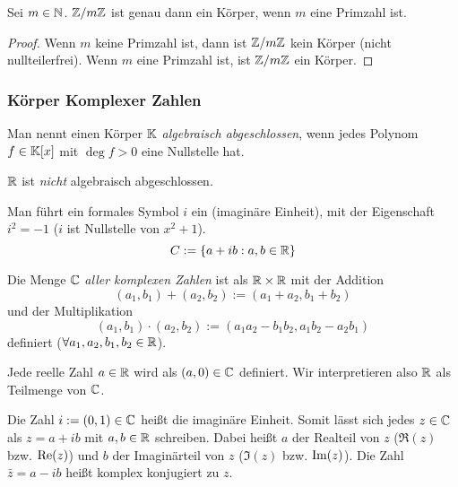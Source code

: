 \begin{thm}
	Sei $ m \in \mathbb N $. $ \mathbb Z/m\mathbb Z $ ist genau dann ein Körper, wenn $ m $ eine Primzahl ist.
\end{thm}
\begin{proof}
	Wenn $ m $ keine Primzahl ist, dann ist $ \mathbb Z/m\mathbb Z $ kein Körper (nicht nullteilerfrei). Wenn $ m $ eine Primzahl ist, ist $ \mathbb Z/m\mathbb Z $ ein Körper.
\end{proof}

\subsubsection{Körper Komplexer Zahlen}

Man nennt einen Körper $ \mathbb K $ \emph{algebraisch abgeschlossen}, wenn jedes Polynom $ f \in \mathbb K[x] $ mit $ \deg f > 0 $ eine Nullstelle hat.

\begin{bem}
	$ \mathbb R $ ist \emph{nicht} algebraisch abgeschlossen.
\end{bem}

\begin{bem}[Intuition zu $ \C $]
	Man führt ein formales Symbol $ i $ ein (imaginäre Einheit), mit der Eigenschaft $ i^2 = -1 $ ($ i $ ist Nullstelle von $ x^2+1 $).
	\begin{equation*}
		C := \{ a+ib : a,b \in \mathbb R \}
	\end{equation*}
\end{bem}

\begin{bem}
	Die Menge $ \C $ \emph{aller komplexen Zahlen} ist als $ \mathbb R \times \mathbb R $ mit der Addition 
	\begin{equation*}
		(a_{1},b_{1})+(a_{2},b_{2}) := (a_{1} + a_{2}, b_{1} + b_{2} )
	\end{equation*} 
	und der Multiplikation
	\begin{equation*}
		(a_{1},b_{1})\cdot (a_{2},b_{2}) := (a_{1} a_{2} - b_{1} b_{2}, a_{1} b_{2} - a_{2} b_{1})
	\end{equation*}
	definiert ($ \forall a_1, a_2, b_1, b_2 \in \mathbb R $).
	
	Jede reelle Zahl $ a \in \mathbb R $ wird als $ (a,0) \in \mathbb C $ definiert. Wir interpretieren also $ \mathbb R $ als Teilmenge von $ \C $.
	
	Die Zahl $ i := (0,1) \in \mathbb C $ heißt die imaginäre Einheit. Somit lässt sich jedes $ z \in \mathbb C $ als $ z = a+ib $ mit $ a,b \in \mathbb R $ schreiben. Dabei heißt $ a $ der Realteil von $ z $ ($ \Re(z) $ bzw. $ \operatorname{Re}(z) $) und $ b $ der Imaginärteil von $ z $ ($ \Im(z) $ bzw. $ \operatorname{Im}(z) $). Die Zahl $ \bar{z} = a -ib $ heißt komplex konjugiert zu $ z $.
\end{bem}

